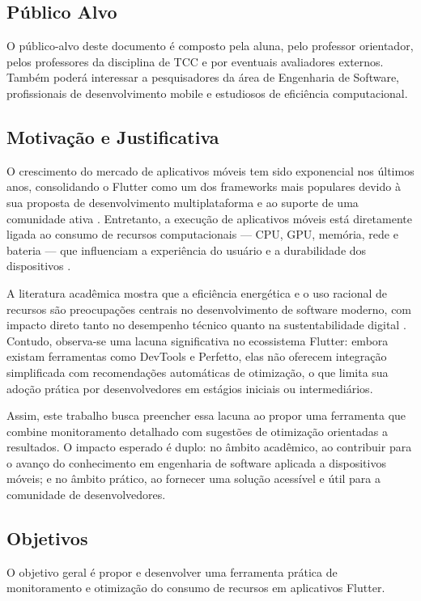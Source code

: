 \documentclass[12pt,a4paper]{article}
\begin{document}
\subsection{Público Alvo}
O público-alvo deste documento é composto pela aluna, pelo professor orientador, pelos professores da disciplina de TCC e por eventuais avaliadores externos. Também poderá interessar a pesquisadores da área de Engenharia de Software, profissionais de desenvolvimento mobile e estudiosos de eficiência computacional.

\subsection{Motivação e Justificativa}
O crescimento do mercado de aplicativos móveis tem sido exponencial nos últimos anos, consolidando o Flutter como um dos frameworks mais populares devido à sua proposta de desenvolvimento multiplataforma e ao suporte de uma comunidade ativa \cite{flutter}. Entretanto, a execução de aplicativos móveis está diretamente ligada ao consumo de recursos computacionais — CPU, GPU, memória, rede e bateria — que influenciam a experiência do usuário e a durabilidade dos dispositivos \cite{energy, monitoring}.  

A literatura acadêmica mostra que a eficiência energética e o uso racional de recursos são preocupações centrais no desenvolvimento de software moderno, com impacto direto tanto no desempenho técnico quanto na sustentabilidade digital \cite{mobile_energy, performance}. Contudo, observa-se uma lacuna significativa no ecossistema Flutter: embora existam ferramentas como DevTools e Perfetto, elas não oferecem integração simplificada com recomendações automáticas de otimização, o que limita sua adoção prática por desenvolvedores em estágios iniciais ou intermediários.  

Assim, este trabalho busca preencher essa lacuna ao propor uma ferramenta que combine monitoramento detalhado com sugestões de otimização orientadas a resultados. O impacto esperado é duplo: no âmbito acadêmico, ao contribuir para o avanço do conhecimento em engenharia de software aplicada a dispositivos móveis; e no âmbito prático, ao fornecer uma solução acessível e útil para a comunidade de desenvolvedores.

\subsection{Objetivos}
O objetivo geral é propor e desenvolver uma ferramenta prática de monitoramento e otimização do consumo de recursos em aplicativos Flutter.  
\end{document}
